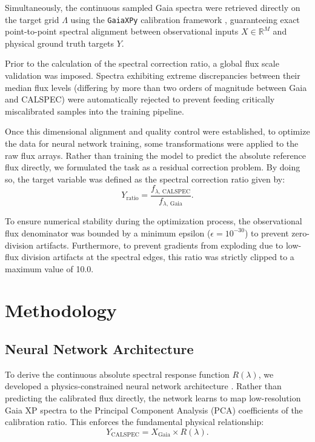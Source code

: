 \documentclass{aa}
\begin{document}
Simultaneously, the continuous sampled Gaia spectra were retrieved directly on the target grid $\Lambda$ using the \texttt{GaiaXPy} calibration framework \citep{gaiaxpy_2022}, guaranteeing exact point-to-point spectral alignment between observational inputs $X \in \mathbb{R}^M$ and physical ground truth targets $Y$.

Prior to the calculation of the spectral correction ratio, a global flux scale validation was imposed. Spectra exhibiting extreme discrepancies between their median flux levels (differing by more than two orders of magnitude between Gaia and CALSPEC) were automatically rejected to prevent feeding critically miscalibrated samples into the training pipeline.

Once this dimensional alignment and quality control were established, to optimize the data for neural network training, some transformations were applied to the raw flux arrays. Rather than training the model to predict the absolute reference flux directly, we formulated the task as a residual correction problem. By doing so, the target variable was defined as the spectral correction ratio given by:
\begin{equation}
    Y_{\text{ratio}} = \frac{f_{\lambda,\, \text{CALSPEC}}}{f_{\lambda,\, \text{Gaia}}}. 
\end{equation}

To ensure numerical stability during the optimization process, the observational flux denominator was bounded by a minimum epsilon ($\epsilon = 10^{-30}$) to prevent zero-division artifacts. Furthermore, to prevent gradients from exploding due to low-flux division artifacts at the spectral edges, this ratio was strictly clipped to a maximum value of 10.0.


\section{Methodology} \label{sec:methodology}

\subsection{Neural Network Architecture}
To derive the continuous absolute spectral response function $R(\lambda)$, we developed a physics-constrained neural network architecture \citep{ness2015, karniadakis2021}. Rather than predicting the calibrated flux directly, the network learns to map low-resolution Gaia XP spectra to the Principal Component Analysis (PCA) coefficients of the calibration ratio. This enforces the fundamental physical relationship:
\begin{equation}
    Y_{\text{CALSPEC}} = X_{\text{Gaia}} \times R(\lambda).
\end{equation}
\end{document}

